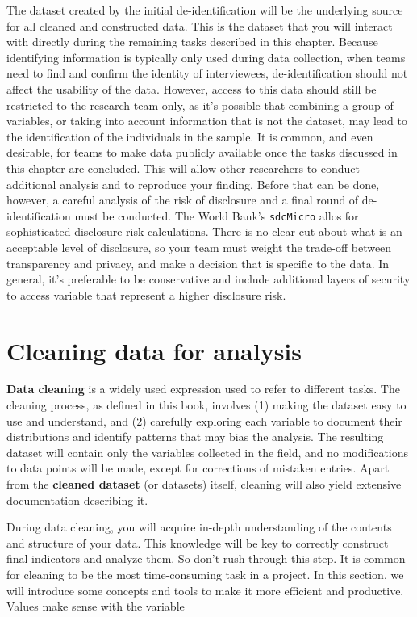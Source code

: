 \begin{fullwidth}
The dataset created by the initial de-identification will be the underlying source for all cleaned and constructed data.
This is the dataset that you will interact with directly during the remaining tasks described in this chapter.
Because identifying information is typically only used during data collection,
when teams need to find and confirm the identity of interviewees,
de-identification should not affect the usability of the data.
However, access to this data should still be restricted to the research team only,
as it's possible that combining a group of variables,
or taking into account information that is not the dataset,
may lead to the identification of the individuals in the sample.
It is common, and even desirable, for teams to make data publicly available
once the tasks discussed in this chapter are concluded.
This will allow other researchers to conduct additional analysis and to reproduce your finding.
Before that can be done, however,
a careful analysis of the risk of disclosure and a final round of de-identification must be conducted.
The World Bank's \texttt{sdcMicro} allos for sophisticated disclosure risk calculations.
There is no clear cut about what is an acceptable level of disclosure,
so your team must weight the trade-off between transparency and privacy,
and make a decision that is specific to the data.
In general, it's preferable to be conservative and include additional layers of security
to access variable that represent a higher disclosure risk.


\section{Cleaning data for analysis}

\textbf{Data cleaning} is a widely used expression used to refer to different tasks.
The cleaning process, as defined in this book, involves
(1) making the dataset easy to use and understand, and 
(2) carefully exploring each variable to document their distributions and identify patterns that may bias the analysis.
The resulting dataset will contain only the variables collected in the field, and
no modifications to data points will be made, 
except for corrections of mistaken entries.
Apart from the \textbf{cleaned dataset} (or datasets) itself,
cleaning will also yield extensive documentation describing  it.

During data cleaning, you will acquire in-depth understanding of the contents and structure of your data.
This knowledge will be key to correctly construct final indicators and analyze them.
So don't rush through this step.
It is common for cleaning to be the most time-consuming task in a project.
In this section, we will introduce some concepts and tools to make it more efficient and productive.
Values make sense with the variable


\end{fullwidth}
